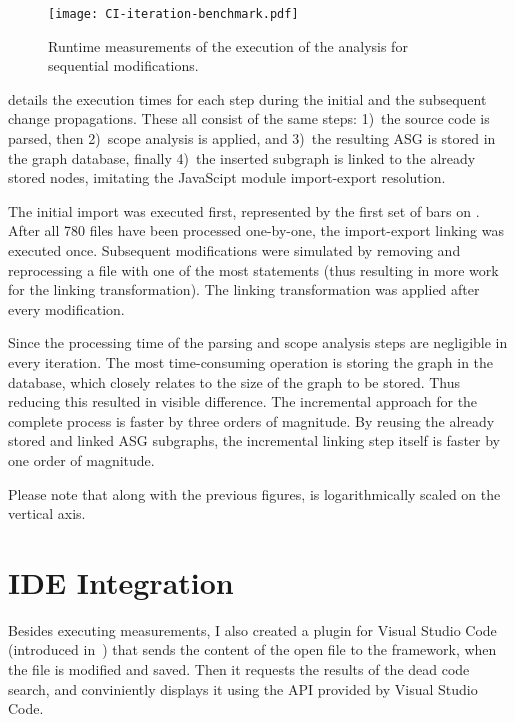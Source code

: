 \begin{figure}[!htb]
  \centering
  \texttt{[image: CI-iteration-benchmark.pdf]}
  \caption{Runtime measurements of the execution of the analysis for sequential modifications.}
  \label{fig:CI-iteration-benchmark}
\end{figure}

 details the execution times for each step during the initial and the subsequent change propagations. These all consist of the same steps: 1)~the source code is parsed, then 2)~scope analysis is applied, and 3)~the resulting ASG is stored in the graph database, finally 4)~the inserted subgraph is linked to the already stored nodes, imitating the JavaScipt module import-export resolution.

The initial import was executed first, represented by the first set of bars on . After all 780 files have been processed one-by-one, the import-export linking was executed once. Subsequent modifications were simulated by removing and reprocessing a file with one of the most  statements (thus resulting in more work for the linking transformation). The linking transformation was applied after every modification.

Since the processing time of the parsing and scope analysis steps are negligible in every iteration. The most time-consuming operation is storing the graph in the database, which closely relates to the size of the graph to be stored. Thus reducing this resulted in visible difference. The incremental approach for the complete process is faster by three orders of magnitude. By reusing the already stored and linked ASG subgraphs, the incremental linking step itself is faster by one order of magnitude.

Please note that along with the previous figures,  is logarithmically scaled on the vertical axis.


\section{IDE Integration}
\label{sect:ide-integration}
Besides executing measurements, I also created a plugin for Visual Studio Code (introduced in~) that sends the content of the open file to the framework, when the file is modified and saved. Then it requests the results of the dead code search, and conviniently displays it using the API provided by Visual Studio Code.

